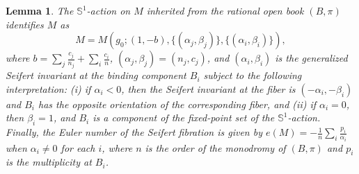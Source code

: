 \documentclass[11pt]{amsart}
\theoremstyle{plain}
\numberwithin{theorem}{section}
\newtheorem{lemma}[theorem]{Lemma}
\theoremstyle{definition}
\newcommand{\s}{{\mathbb S}}
\begin{document}
\begin{lemma}
The $\s^1$-action on $M$ inherited from the rational open book $(B,\pi)$ identifies $M$ as
$$
M=M(g_0; (1, -b), \{(\alpha_j,\beta_j)\}, \{(\alpha_i,\beta_i)\}), 
$$
where $b=\sum_j \frac{c_j}{n_j}+\sum_i \frac{c_i}{n}$, $(\alpha_j,\beta_j)=(n_j,c_j)$, and
$(\alpha_i,\beta_i)$ is the generalized Seifert invariant at the binding component $B_i$ subject
to the following interpretation: {\em(}i{\em)} if $\alpha_i<0$, then the Seifert invariant at the fiber is 
$(-\alpha_i,-\beta_i)$ and $B_i$ has the opposite orientation of the corresponding fiber, 
and {\em(}ii{\em)} if $\alpha_i=0$, then $\beta_i=1$, and $B_i$ is a component of the fixed-point set of 
the $\s^1$-action. Finally, the Euler number of the Seifert fibration is given by
$e(M)=-\frac{1}{n} \sum_i \frac{p_i}{\alpha_i}$ when $\alpha_i\neq 0$ for each $i$, where $n$ is the order of the monodromy of $(B,\pi)$ and $p_i$ is the multiplicity at $B_i$. 
\end{lemma}
\end{document}
